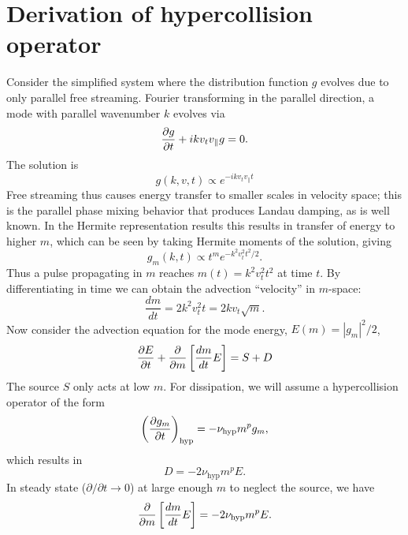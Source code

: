 \documentclass{jpp}
\begin{document}
{\color{black}
\section{Derivation of hypercollision operator} \label{app:hyper}
Consider the simplified system where the distribution function $g$ evolves due to only parallel free streaming. Fourier transforming in the parallel direction, a mode with parallel wavenumber $k$ evolves via
\begin{equation}
    \frac{\partial g}{\partial t} + i k v_t v_\parallel g = 0.
\end{equation}
The solution is 
\begin{equation}
    g(k,v,t) \propto e^{-i k v_t v_\parallel t}
\end{equation}
Free streaming thus causes energy transfer to smaller scales in velocity space; this is the parallel phase mixing behavior that produces Landau damping, as is well known. In the Hermite representation results this results in transfer of energy to higher $m$, which can be seen by taking Hermite moments of the solution, giving
\begin{equation}
    g_m(k,t) \propto t^m e^{- k^2 v_t^2 t^2/2}.
\end{equation}
Thus a pulse propagating in $m$ reaches $m(t) = k^2 v_t^2 t^2$ at time $t$. By differentiating in time we can obtain the advection ``velocity'' in $m$-space:
\begin{equation}
    \frac{d m}{dt} = 2 k^2 v_t^2 t = 2 k v_t \sqrt{m}. \label{madv}
\end{equation}
Now consider the advection equation for the mode energy, $E(m) = |g_m|^2/2$,
\begin{equation}
    \frac{\partial E}{\partial t} + \frac{\partial }{\partial m}\left[\frac{dm}{dt} E\right] = S + D
\end{equation}
The source $S$ only acts at low $m$. For dissipation, we will assume a hypercollision operator of the form
\begin{equation}
    \left(\frac{\partial g_m}{\partial t} \right)_\mathrm{hyp} = - \nu_\mathrm{hyp} m^p g_m,
\end{equation}
which results in
\begin{equation}
    D = - 2 \nu_\mathrm{hyp} m^p E.
\end{equation}
In steady state ($\partial/\partial t \rightarrow 0$) at large enough $m$ to neglect the source, we have
\begin{equation}
    \frac{\partial }{\partial m}\left[\frac{dm}{dt} E\right] = - 2 \nu_\mathrm{hyp} m^p E.
\end{equation}
}
\end{document}

